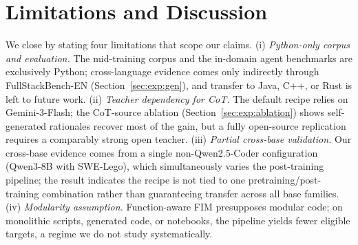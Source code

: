 \section{Limitations and Discussion}
\vspace{-0.5ex}
\label{sec:limitations}
We close by stating four limitations that scope our claims.
(i) \textit{Python-only corpus and evaluation.} The mid-training corpus
and the in-domain agent benchmarks are exclusively Python; cross-language
evidence comes only indirectly through FullStackBench-EN
(Section~\ref{sec:exp:gen}), and transfer to Java, C++, or Rust is left
to future work.
(ii) \textit{Teacher dependency for CoT.} The default recipe relies on
Gemini-3-Flash; the CoT-source ablation (Section~\ref{sec:exp:ablation})
shows self-generated rationales recover most of the gain, but a fully
open-source replication requires a comparably strong open teacher.
(iii) \textit{Partial cross-base validation.} Our cross-base evidence
comes from a single non-Qwen2.5-Coder configuration (Qwen3-8B with
SWE-Lego), which simultaneously varies the post-training pipeline; the
result indicates the recipe is not tied to one pretraining/post-training
combination rather than guaranteeing transfer across all base families.
(iv) \textit{Modularity assumption.} Function-aware FIM presupposes
modular code; on monolithic scripts, generated code, or notebooks, the
pipeline yields fewer eligible targets, a regime we do not study
systematically.
